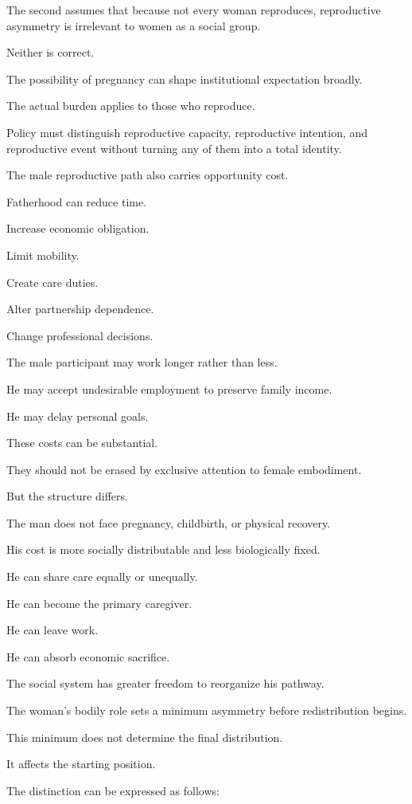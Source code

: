 The second assumes that because not every woman reproduces, reproductive asymmetry is irrelevant to women as a social group.

Neither is correct.

The possibility of pregnancy can shape institutional expectation broadly.

The actual burden applies to those who reproduce.

Policy must distinguish reproductive capacity, reproductive intention, and reproductive event without turning any of them into a total identity.

The male reproductive path also carries opportunity cost.

Fatherhood can reduce time.

Increase economic obligation.

Limit mobility.

Create care duties.

Alter partnership dependence.

Change professional decisions.

The male participant may work longer rather than less.

He may accept undesirable employment to preserve family income.

He may delay personal goals.

These costs can be substantial.

They should not be erased by exclusive attention to female embodiment.

But the structure differs.

The man does not face pregnancy, childbirth, or physical recovery.

His cost is more socially distributable and less biologically fixed.

He can share care equally or unequally.

He can become the primary caregiver.

He can leave work.

He can absorb economic sacrifice.

The social system has greater freedom to reorganize his pathway.

The woman’s bodily role sets a minimum asymmetry before redistribution begins.

This minimum does not determine the final distribution.

It affects the starting position.

The distinction can be expressed as follows:

